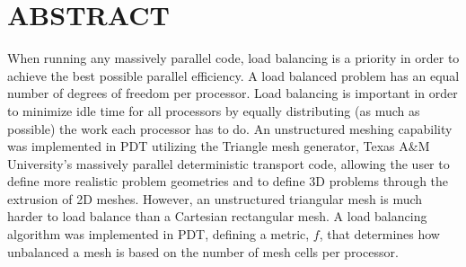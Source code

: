 %
%
%

\chapter*{ABSTRACT}

\pagestyle{plain} %
\setcounter{page}{2}

\indent When running any massively parallel code, load balancing is a priority in order to achieve the best possible parallel efficiency. A load balanced problem has an equal number of degrees of freedom per processor. Load balancing is important in order to minimize idle time for all processors by equally distributing (as much as possible) the work each processor has to do. 
\indent An unstructured meshing capability was implemented in PDT utilizing the Triangle mesh generator, Texas A\&M University's massively parallel deterministic transport code, allowing the user to define more realistic problem geometries and to define 3D problems through the extrusion of 2D meshes. However, an unstructured triangular mesh is much harder to load balance than a Cartesian rectangular mesh. A load balancing algorithm was implemented in PDT, defining a metric, $f$, that determines how unbalanced a mesh is based on the number of mesh cells per processor. 

 

\pagebreak{}
